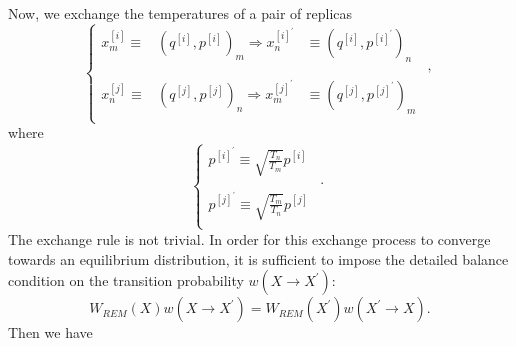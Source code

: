 Now, we exchange the temperatures of a pair of replicas
\begin{equation}
	\left\{ 
	\begin{array}{rcll} 
		x_m^{[i]}\equiv& \left(q^{[i]},p^{[i]}\right)_m \Rightarrow x_n^{[i]^\prime}&\equiv \left(q^{[i]},p^{[i]^\prime}\right)_n&\\ 
		&&&,\\
		x_n^{[j]}\equiv& \left(q^{[j]},p^{[j]}\right)_n \Rightarrow x_m^{[j]^\prime}&\equiv \left(q^{[j]},p^{[j]^\prime}\right)_m&\\  
	\end{array} 
	\right. 
\end{equation}
where
\begin{equation}
	\left\{ 
	\begin{array}{rl} 
		p^{[i]^\prime}\equiv \sqrt{\frac{T_n}{T_m}} p^{[i]}&\\ 
		&.\\
		p^{[j]^\prime}\equiv \sqrt{\frac{T_m}{T_n}} p^{[j]}&\\  
	\end{array} 
	\right. 
\end{equation}
The exchange rule is not trivial. In order for this exchange process to converge towards an equilibrium distribution, it is sufficient to impose the detailed balance condition on the transition probability $w(X\rightarrow X^\prime)$:
\begin{equation}
	W_{REM}(X)w(X\rightarrow X^\prime) = W_{REM}(X^\prime)w(X^\prime\rightarrow X).
\end{equation}
Then we have
